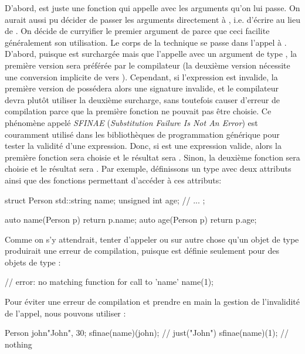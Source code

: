 D'abord,  est juste une fonction qui appelle 
avec les arguments qu'on lui passe. On aurait aussi pu décider de passer les
arguments directement à , i.e. d'écrire 
au lieu de . On décide de curryifier le premier argument
de  parce que ceci facilite généralement son utilisation. Le corps
de la technique se passe dans l'appel à .
D'abord, puisque  est surchargée mais que  l'appelle
avec un argument de type , la première version sera préférée par le
compilateur (la deuxième version nécessite une conversion implicite de 
vers ). Cependant, si l'expression  est invalide,
la première version de  possédera alors une signature invalide,
et le compilateur devra plutôt utiliser la deuxième surcharge, sans toutefois
causer d'erreur de compilation parce que la première fonction ne pouvait pas
être choisie. Ce phénomène appelé \textit{SFINAE} (\textit{Substitution
Failure Is Not An Error}) est couramment utilisé dans les bibliothèques de
programmation générique pour tester la validité d'une expression. Donc, si
 est une expression valide, alors la première fonction
sera choisie et le résultat sera . Sinon, la deuxième
fonction sera choisie et le résultat sera . Par exemple,
définissons un type  avec deux attributs ainsi que des
fonctions permettant d'accéder à ces attributs:
\begin{cpp}
    struct Person {
        std::string name;
        unsigned int age;
        // ...
    };

    auto name(Person p) { return p.name; }
    auto age(Person p) { return p.age; }
\end{cpp}

Comme on s'y attendrait, tenter d'appeler  ou  sur autre
chose qu'un objet de type  produirait une erreur de compilation,
puisque  est définie seulement pour des objets de type :
\begin{cpp}
    // error: no matching function for call to 'name'
    name(1);
\end{cpp}

Pour éviter une erreur de compilation et prendre en main la gestion de
l'invalidité de l'appel, nous pouvons utiliser :
\begin{cpp}
    Person john{"John", 30};
    sfinae(name)(john); // just("John")
    sfinae(name)(1);    // nothing
\end{cpp}

